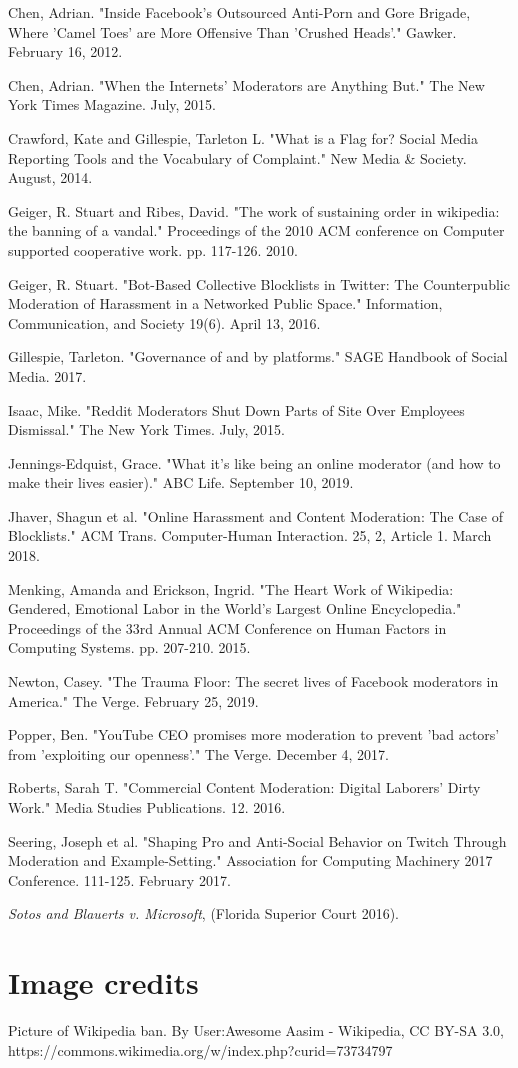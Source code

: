 \documentclass[class=book, crop=false]{standalone}
\begin{document}
Chen, Adrian. "Inside Facebook's Outsourced Anti-Porn and Gore Brigade, Where 'Camel Toes' are More Offensive Than 'Crushed Heads'." Gawker. February 16, 2012.

Chen, Adrian. "When the Internets' Moderators are Anything But." The New York Times Magazine. July, 2015.

Crawford, Kate and Gillespie, Tarleton L. "What is a Flag for? Social Media Reporting Tools and the Vocabulary of Complaint." New Media \& Society. August, 2014.

Geiger, R. Stuart and Ribes, David. "The work of sustaining order in wikipedia: the banning of a vandal." Proceedings of the 2010 ACM conference on Computer supported cooperative work. pp. 117-126. 2010.

Geiger, R. Stuart. "Bot-Based Collective Blocklists in Twitter: The Counterpublic Moderation of Harassment in a Networked Public Space." Information, Communication, and Society 19(6). April 13, 2016.

Gillespie, Tarleton. "Governance of and by platforms." SAGE Handbook of Social Media. 2017.

Isaac, Mike. "Reddit Moderators Shut Down Parts of Site Over Employees Dismissal." The New York Times. July, 2015.

Jennings-Edquist, Grace. "What it's like being an online moderator (and how to make their lives easier)." ABC Life. September 10, 2019.

Jhaver, Shagun et al. "Online Harassment and Content Moderation: The Case of Blocklists." ACM Trans. Computer-Human Interaction. 25, 2, Article 1. March 2018.

Menking, Amanda and Erickson, Ingrid. "The Heart Work of Wikipedia: Gendered, Emotional Labor in the World's Largest Online Encyclopedia." Proceedings of the 33rd Annual ACM Conference on Human Factors in Computing Systems. pp. 207-210. 2015.

Newton, Casey. "The Trauma Floor: The secret lives of Facebook moderators in America." The Verge. February 25, 2019.

Popper, Ben. "YouTube CEO promises more moderation to prevent 'bad actors' from 'exploiting our openness'." The Verge. December 4, 2017.

Roberts, Sarah T. "Commercial Content Moderation: Digital Laborers' Dirty Work." Media Studies Publications. 12. 2016.

Seering, Joseph et al. "Shaping Pro and Anti-Social Behavior on Twitch Through Moderation and Example-Setting." Association for Computing Machinery 2017 Conference. 111-125. February 2017.

\textit{Sotos and Blauerts v. Microsoft}, (Florida Superior Court 2016).

\section{Image credits}

Picture of Wikipedia ban. By User:Awesome Aasim - Wikipedia, CC BY-SA 3.0, https://commons.wikimedia.org/w/index.php?curid=73734797
\end{document}
